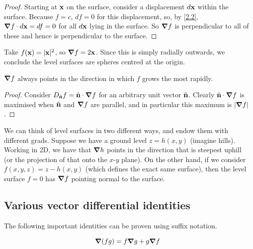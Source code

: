 \documentclass{../../template/note}
\begin{document}
    \begin{proof}
        Starting at \(\V x\) on the surface, consider a displacement \(d\V x\) within the surface. Because \(f = c\), \(df = 0\) for this displacement, so, by \cref{2.2}, \(\grad f \cdot d \V x = df = 0\) for all \(d \V x\) lying in the surface. So \(\grad f\) is perpendicular to all of these and hence is perpendicular to the surface.
    \end{proof}
    
    \begin{example*}
        Take \(f(\V x) = |\V x|^2\), so \(\grad f = 2 \V x\). Since this is simply radially outwards, we conclude the level surfaces are spheres centred at the origin.
    \end{example*}
    
    \begin{proposition*}
        \(\grad f\) always points in the direction in which \(f\) grows the most rapidly.
    \end{proposition*}
    
    \begin{proof}
        Consider \(D_{\hvec n}f = \hvec n \cdot \grad f\) for an arbitrary unit vector \(\hvec n\). Clearly \(\hvec n \cdot \grad f\) is maximised when \(\hvec n\) and \(\grad f\) are parallel, and in particular this maximum is \(|\grad f|\).
    \end{proof}
    
    
    \begin{remark*}
        We can think of level surfaces in two different ways, and endow them with different grads. Suppose we have a ground level \(z = h(x, y)\) (imagine hills). Working in 2D, we have that \(\grad h\) points in the direction that is steepest uphill (or the projection of that onto the \(x\)-\(y\) plane). On the other hand, if we consider \(f(x, y, z) = z - h(x, y)\) (which defines the exact same surface), then the level surface \(f = 0\) has \(\grad f\) pointing normal to the surface.
    \end{remark*}
    
    \subsection{Various vector differential identities}

    The following important identities can be proven using suffix notation.

    \begin{proposition}
        \[
            \grad(fg) = f \grad g + g \grad f
        \]
    \end{proposition}
    
\end{document}

